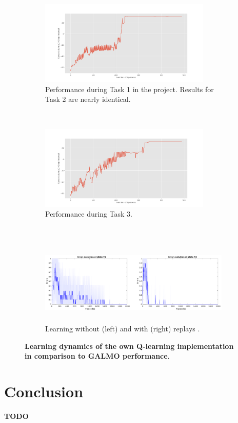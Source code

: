 \documentclass[a4paper]{article}
\begin{document}
	\begin{figure}[h]
		\centering
		\begin{subfigure}{1\textwidth}
			\centering
			\includegraphics[height=4cm]{./figs/Task1.png}
			\caption{Performance during Task 1 in the project. Results for Task 2 are nearly identical.}
			\label{fig:task12}
		\end{subfigure}\\
		\begin{subfigure}{1\textwidth}
			\centering
			\includegraphics[height=4cm]{./figs/Task3.png}
			\caption{Performance during Task 3.}
			\label{fig:task3}
		\end{subfigure}\\
		\begin{subfigure}{1\textwidth}
			\centering
			\includegraphics[height=4cm]{./figs/QvsDyna2.pdf}
			\caption{Learning without (left) and with (right) replays \citep{NeuralDynaQ}.}
			\label{fig:galmo}
		\end{subfigure}
		\caption{\textbf{Learning dynamics of the own Q-learning implementation in comparison to GALMO performance}.}
		\label{fig:tasks}
	\end{figure}
	
	\section{Conclusion}
	\label{sec:conclusion}
	\textbf{TODO}
	
	
	\footnotesize
	
	
	\newpage
\end{document}
